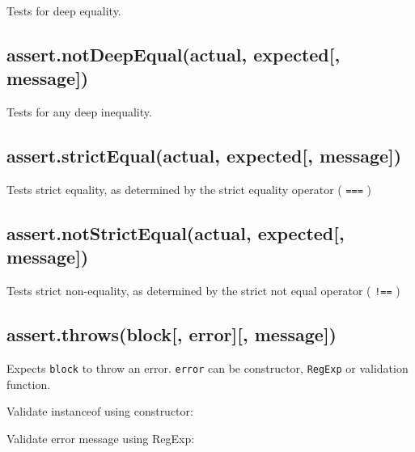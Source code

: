 Tests for deep equality.

\subsection{assert.notDeepEqual(actual, expected{[},
message{]})}\label{assert.notdeepequalactual-expected-message}

Tests for any deep inequality.

\subsection{assert.strictEqual(actual, expected{[},
message{]})}\label{assert.strictequalactual-expected-message}

Tests strict equality, as determined by the strict equality operator (
\texttt{===} )

\subsection{assert.notStrictEqual(actual, expected{[},
message{]})}\label{assert.notstrictequalactual-expected-message}

Tests strict non-equality, as determined by the strict not equal
operator ( \texttt{!==} )

\subsection{assert.throws(block{[}, error{]}{[},
message{]})}\label{assert.throwsblock-error-message}

Expects \texttt{block} to throw an error. \texttt{error} can be
constructor, \texttt{RegExp} or validation function.

Validate instanceof using constructor:

\begin{Shaded}
\begin{Highlighting}[]
\NormalTok{(}
  \NormalTok{() \{}
      \NormalTok{(}\NormalTok{);}
  \NormalTok{\},}
\NormalTok{);}
\end{Highlighting}
\end{Shaded}

Validate error message using RegExp:

\begin{Shaded}
\begin{Highlighting}[]
\NormalTok{(}
  \NormalTok{() \{}
      \NormalTok{(}\NormalTok{);}
  \NormalTok{\},}
\NormalTok{);}
\end{Highlighting}
\end{Shaded}

